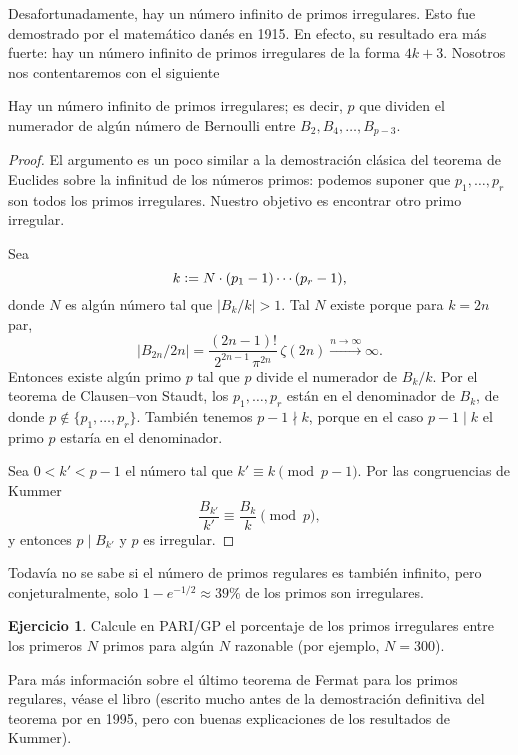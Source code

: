\documentclass{article}
\numberwithin{equation}{section}
\theoremstyle{definition}
\newtheorem{ejercicio}{Ejercicio}
\begin{document}
\pagebreak

Desafortunadamente, hay un número infinito de primos irregulares. Esto fue
demostrado por el matemático danés  en 1915.
En efecto, su resultado era más fuerte: hay un número infinito de primos
irregulares de la forma $4k + 3$. Nosotros nos contentaremos con el siguiente

\begin{teorema}
  \label{infinitos-irregulares}
  Hay un número infinito de primos irregulares; es decir, $p$ que dividen
  el numerador de algún número de Bernoulli entre $B_2, B_4, \ldots, B_{p-3}$.
\end{teorema}

\begin{proof}
  El argumento es un poco similar a la demostración clásica del teorema de
  Euclides sobre la infinitud de los números primos: podemos suponer que
  $p_1,\ldots,p_r$ son todos los primos irregulares. Nuestro objetivo es
  encontrar otro primo irregular.

  Sea
  $$k \mathrel{\mathop:}= N\cdot (p_1 - 1)\cdots (p_r - 1),$$
  donde $N$ es algún número tal que $|B_k/k| > 1$. Tal $N$ existe porque para
  $k = 2n$ par,
  $$|B_{2n}/2n| = \frac{(2n-1)!}{2^{2n-1}\,\pi^{2n}}\,\zeta (2n) \xrightarrow{n \to \infty} \infty.$$
  Entonces existe algún primo $p$ tal que $p$ divide el numerador de
  $B_k/k$. Por el teorema de Clausen--von Staudt, los $p_1, \ldots, p_r$ están
  en el denominador de $B_k$, de donde
  $p \notin \{ p_1, \ldots, p_r \}$. También tenemos $p-1 \nmid k$, porque en
  el caso $p-1 \mid k$ el primo $p$ estaría en el denominador.

  Sea $0 < k' < p-1$ el número tal que $k' \equiv k \pmod{p-1}$. Por las
  congruencias de Kummer
  $$\frac{B_{k'}}{k'} \equiv \frac{B_k}{k} \pmod{p},$$
  y entonces $p \mid B_{k'}$ y $p$ es irregular.
\end{proof}

Todavía no se sabe si el número de primos regulares es también infinito, pero
conjeturalmente, solo $1 - e^{-1/2} \approx 39\%$ de los primos son irregulares.

\begin{ejercicio}
  Calcule en PARI/GP el porcentaje de los primos irregulares entre los primeros
  $N$ primos para algún $N$ razonable (por ejemplo, $N = 300$).

\end{ejercicio}

Para más información sobre el último teorema de Fermat para los primos
regulares, véase el libro \cite{Ribenboim-1979} (escrito mucho antes de
la demostración definitiva del teorema por  en 1995,
pero con buenas explicaciones de los resultados de Kummer).

\pagebreak


{\small}
\end{document}
